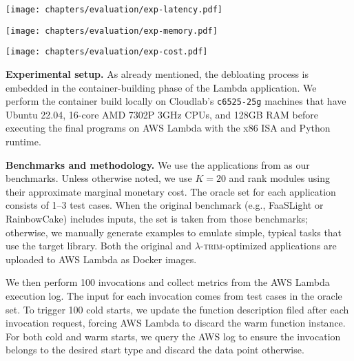 \documentclass[sigplan,nonacm]{acmart}
\newcommand{\sys}{\textsc{\ensuremath{\lambda}-trim}\xspace}
\newcommand{\topheading}[1]{\noindent\textbf{#1.}}
\newcommand{\heading}[1]{\vspace{4pt}\noindent\textbf{#1.}}
\newcounter{example}
\begin{document}
\begin{figure*}[t]
  \centering
    \texttt{[image: chapters/evaluation/exp-latency.pdf]}
    
    \vspace{-0.3em}
    
    \texttt{[image: chapters/evaluation/exp-memory.pdf]}
    
    \vspace{-0.3em}
    
    \texttt{[image: chapters/evaluation/exp-cost.pdf]}

\vspace{-0.7em}
  \caption{\sys's improvements to latency, memory footprint, and monetary cost for our benchmarked applications.
  The left axis and bars show the results for the original and trimmed versions.
  For latency, we show a breakdown of E2E versus Function Initialization time.
  The right axis and line graph show the relative improvement of \sys.
  The dashed line helps illustrate the speedup or improvement against the original application.}
  \label{fig:principal}
\end{figure*}

\vspace{-0.35em}
\topheading{Experimental setup}
As already mentioned, the debloating process is embedded in the container-building phase of the Lambda application.
We perform the container build locally on Cloudlab's \cite{cloudlab} \texttt{c6525-25g} machines that have Ubuntu 22.04, 16-core AMD 7302P 3GHz CPUs, and 128GB RAM before executing the final programs on AWS Lambda with the x86 ISA and Python runtime.
 
\heading{Benchmarks and methodology}
We use the applications from  as our benchmarks.
Unless otherwise noted, we use $K=20$ and rank modules using their approximate marginal monetary cost. 
The oracle set for each application consists of 1--3 test cases.
When the original benchmark (e.g., FaaSLight or RainbowCake) includes inputs, the set is taken from those benchmarks;
otherwise, we manually generate examples to emulate simple, typical tasks that use the target library.
Both the original and \sys-optimized applications are uploaded to AWS Lambda as Docker images.

We then perform 100 invocations and collect metrics from the AWS Lambda execution log.
The input for each invocation comes from test cases in the oracle set.
To trigger 100 cold starts, we update the function description filed after each invocation request, forcing AWS Lambda to discard the warm function instance.
For both cold and warm starts, we query the AWS log to ensure the invocation belongs to the desired start type and discard the data point otherwise.
\end{document}
